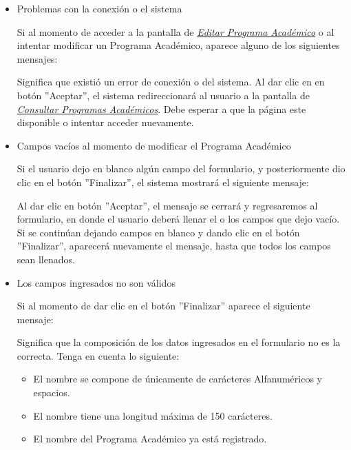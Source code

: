             \begin{itemize}
            	\item Problemas con la conexión o el sistema

                	Si al momento de acceder a la pantalla de \hyperlink{editarpa}{\textit{Editar Programa Académico}} o al intentar modificar un Programa Académico, aparece alguno de los siguientes mensajes:


                	Significa que existió un error de conexión o del sistema. Al dar clic en en botón ''Aceptar'', el sistema redireccionará al usuario a la pantalla de \hyperlink{consultarpa}{\textit{Consultar Programas Académicos}}. Debe esperar a que la página este disponible o intentar acceder nuevamente.

            	\item Campos vacíos al momento de modificar el Programa Académico

                	Si el usuario dejo en blanco algún campo del formulario, y posteriormente dio clic en el botón ''Finalizar'', el sistema mostrará el siguiente mensaje:


            	    Al dar clic en botón ''Aceptar'', el mensaje se cerrará y regresaremos al formulario, en donde el usuario deberá llenar el o los campos que dejo vacío. Si se continúan dejando campos en blanco y dando clic en el botón ''Finalizar'', aparecerá nuevamente el mensaje, hasta que todos los campos sean llenados.

            	\item Los campos ingresados no son válidos

                	Si al momento de dar clic en el botón ''Finalizar'' aparece el siguiente mensaje:

                	Significa que la composición de los datos ingresados en el formulario no es la correcta. Tenga en cuenta lo siguiente:

                	\begin{itemize}
                		\item El nombre se compone de únicamente de carácteres Alfanuméricos y espacios.

                        \item El nombre tiene una longitud máxima de 150 carácteres.

                        \item El nombre del Programa Académico ya está registrado.
                	\end{itemize}

            \end{itemize}
